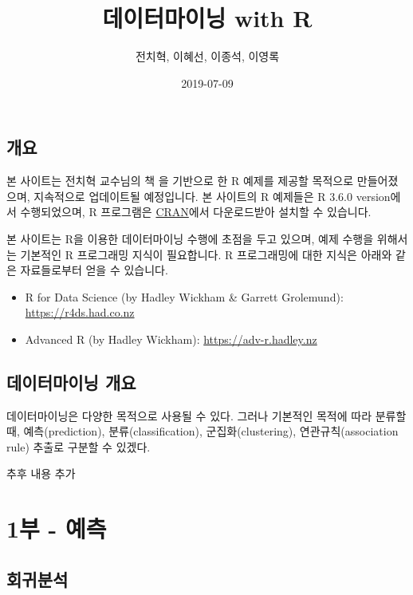\documentclass[]{book}
\title{데이터마이닝 with R}
\author{전치혁, 이혜선, 이종석, 이영록}
\date{2019-07-09}
\providecommand{\tightlist}{%
  \setlength{\itemsep}{0pt}\setlength{\parskip}{0pt}}
\begin{document}
\maketitle

{
\setcounter{tocdepth}{1}
\tableofcontents
}
\chapter*{개요}

본 사이트는 전치혁 교수님의 책 \href{http://www.hannarae.net/books/area.php?ptype=view\&prdcode=1409250010}{}을 기반으로 한 R 예제를 제공할 목적으로 만들어졌으며, 지속적으로 업데이트될 예정입니다. 본 사이트의 R 예제들은 R 3.6.0 version에서 수행되었으며, R 프로그램은 \href{https://cran.r-project.org}{CRAN}에서 다운로드받아 설치할 수 있습니다.

본 사이트는 R을 이용한 데이터마이닝 수행에 초점을 두고 있으며, 예제 수행을 위해서는 기본적인 R 프로그래밍 지식이 필요합니다. R 프로그래밍에 대한 지식은 아래와 같은 자료들로부터 얻을 수 있습니다.

\begin{itemize}
\tightlist
\item
  R for Data Science (by Hadley Wickham \& Garrett Grolemund): \url{https://r4ds.had.co.nz}
\item
  Advanced R (by Hadley Wickham): \url{https://adv-r.hadley.nz}
\end{itemize}

\hypertarget{datamining-overview}{%
\chapter{데이터마이닝 개요}\label{datamining-overview}}

데이터마이닝은 다양한 목적으로 사용될 수 있다. 그러나 기본적인 목적에 따라 분류할 때, 예측(prediction), 분류(classification), 군집화(clustering), 연관규칙(association rule) 추출로 구분할 수 있겠다.

추후 내용 추가

\hypertarget{part-1---}{%
\part{1부 - 예측}\label{part-1---}}

\hypertarget{regression}{%
\chapter{회귀분석}\label{regression}}
\end{document}
